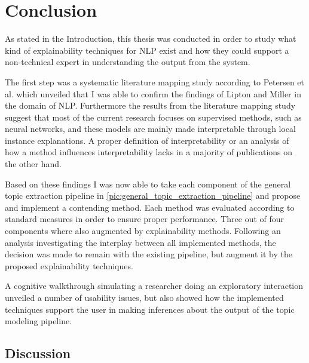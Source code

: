 %
\chapter{Conclusion}
\label{chap:conclusion}

As stated in the Introduction, this thesis was conducted in order to study what kind of explainability techniques for NLP exist and how they could support a non-technical expert in understanding the output from the system.

The first step was a systematic literature mapping study according to Petersen et al. \cite{petersenSystematicMappingStudies} which unveiled that I was able to confirm the findings of Lipton \cite{liptonMythosModelInterpretability2016a} and Miller \cite{millerExplanationArtificialIntelligence2017} in the domain of NLP.
Furthermore the results from the literature mapping study suggest that most of the current research focuses on supervised methods, such as neural networks, and these models are mainly made interpretable through local instance explanations. A proper definition of interpretability or an analysis of how a method influences interpretability lacks in a majority of publications on the other hand.

Based on these findings I was now able to take each component of the general topic extraction pipeline in \autoref{pic:general_topic_extraction_pipeline} and propose and implement a contending method. Each method was evaluated according to standard measures in order to ensure proper performance. Three out of four components where also augmented by explainability methods.
Following an analysis investigating the interplay between all implemented methods, the decision was made to remain with the existing pipeline, but augment it by the proposed explainability techniques.

A cognitive walkthrough simulating a researcher doing an exploratory interaction unveiled a number of usability issues, but also showed how the implemented techniques support the user in making inferences about the output of the topic modeling pipeline. 

\section{Discussion} 

